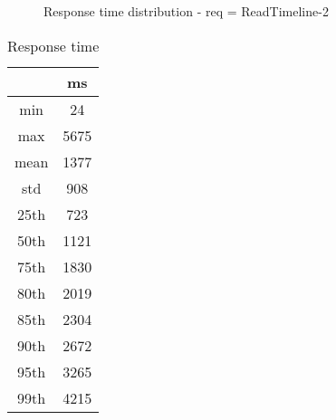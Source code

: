 \begin{minipage}{0.75\linewidth}
\begin{figure}[h]
\begin{adjustbox}{max width=1.0\linewidth, keepaspectratio}
  \end{adjustbox}
  \caption{Response time distribution - req = ReadTimeline-2}
\end{figure}
\end{minipage}\hfill\begin{minipage}{0.18\linewidth}
\begin{table}[h]
\begin{tabular}{|cc|}
\hline
\textbf{} & \textbf{ms}\\ \hline
 \Xhline{0.005\arrayrulewidth}
min & 24\\
 \Xhline{0.005\arrayrulewidth}
max & 5675\\
 \Xhline{0.005\arrayrulewidth}
mean & 1377\\
 \Xhline{0.005\arrayrulewidth}
std & 908\\
\hline
\hline
 \Xhline{0.005\arrayrulewidth}
25th & 723\\
 \Xhline{0.005\arrayrulewidth}
50th & 1121\\
 \Xhline{0.005\arrayrulewidth}
75th & 1830\\
 \Xhline{0.005\arrayrulewidth}
80th & 2019\\
 \Xhline{0.005\arrayrulewidth}
85th & 2304\\
 \Xhline{0.005\arrayrulewidth}
90th & 2672\\
 \Xhline{0.005\arrayrulewidth}
95th & 3265\\
 \Xhline{0.005\arrayrulewidth}
99th & 4215\\
\hline
\end{tabular}
\caption{Response time}
\end{table}
\end{minipage}\hfill